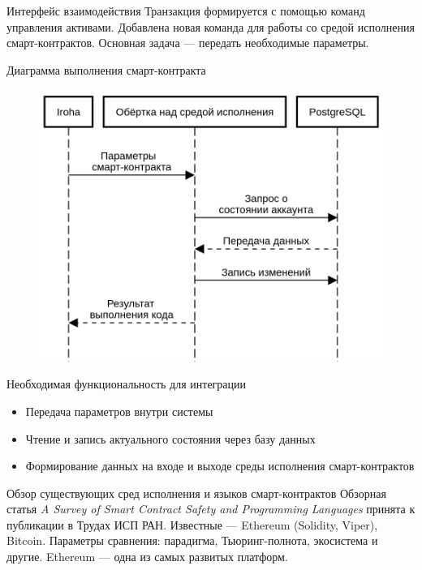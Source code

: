 \documentclass[hyperref={pdfpagelabels=false}]{beamer}
\begin{document}
\begin{frame}{Интерфейс взаимодействия}
Транзакция формируется с помощью команд управления активами.
\vfill
Добавлена новая команда для работы со средой исполнения смарт-контрактов. 
Основная задача --- передать необходимые параметры. 

\end{frame} 

\begin{frame}{Диаграмма выполнения смарт-контракта}
\begin{figure}
\includegraphics[scale=0.32]{Untitled.png}
\end{figure}
\end{frame} 

\begin{frame}{Необходимая функциональность для интеграции}
\begin{itemize}
\item Передача параметров внутри системы
\vfill
\item Чтение и запись актуального состояния через базу данных
\vfill
\item Формирование данных на входе и выходе среды исполнения смарт-контрактов
\end{itemize}
\end{frame} 

\begin{frame}{Обзор существующих сред исполнения и языков смарт-контрактов}
Обзорная статья \emph{A Survey of Smart Contract Safety and Programming Languages} принята к публикации в Трудах ИСП РАН.
\vfill
Известные — Ethereum (Solidity, Viper), Bitcoin. Параметры сравнения: парадигма, Тьюринг-полнота, экосистема и другие.
\vfill
Ethereum --- одна из самых развитых платформ.
\end{frame} 
\end{document}
